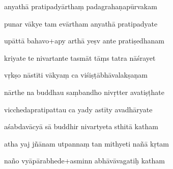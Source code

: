 \documentclass[article,12pt,a4paper]{memoir}%
\newcounter{parCount}
\begin{document}
	  
	  \pstart {} anyathā pratipadyārthaṃ padagrahaṇapūrvakam 
	{}
	\pend%
      

	  
	  \pstart \leavevmode%
	punar vākye tam evārtham anyathā pratipadyate 
	{}
	\pend%
      

	  
	  \pstart {} upāttā bahavo+apy arthā yeṣv ante pratiṣedhanam 
	{}
	\pend%
      

	  
	  \pstart \leavevmode%
	kriyate te nivartante tasmāt tāṃs tatra nāśrayet 
	{}
	\pend%
      

	  
	  \pstart {} vṛkṣo nāstīti vākyaṃ ca viśiṣṭābhāvalakṣaṇam 
	{}
	\pend%
      

	  
	  \pstart \leavevmode%
	nārthe na buddhau saṃbandho nivṛtter avatiṣṭhate 
	{}
	\pend%
      

	  
	  \pstart {} vicchedapratipattau ca yady astīty avadhāryate 
	{}
	\pend%
      

	  
	  \pstart \leavevmode%
	aśabdavācyā sā buddhir nivartyeta sthitā katham 
	{}
	\pend%
      

	  
	  \pstart {} atha yaj jñānam utpannaṃ tan mithyeti nañā kṛtam 
	{}
	\pend%
      

	  
	  \pstart \leavevmode%
	naño vyāpārabhede+asminn abhāvāvagatiḥ katham 
	{}
	\pend%
      
\end{document}
